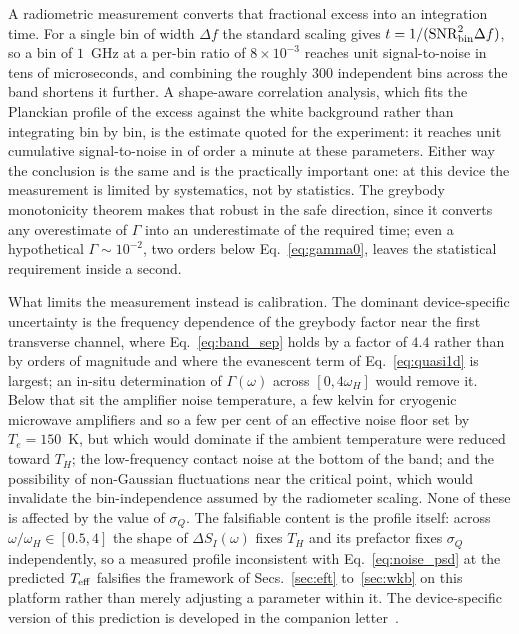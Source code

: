 \documentclass[aps,prd,reprint,nofootinbib,superscriptaddress]{revtex4-2}
\begin{document}
A radiometric measurement converts that fractional excess into an
integration time. For a single bin of width $\Delta f$ the standard
scaling gives $t = 1/(\mathrm{SNR}_{\rm bin}^2 \Delta f)$, so a bin of
$1$~GHz at a per-bin ratio of $8\times10^{-3}$ reaches unit
signal-to-noise in tens of microseconds, and combining the roughly $300$
independent bins across the band shortens it further. A shape-aware
correlation analysis, which fits the Planckian profile of the excess
against the white background rather than integrating bin by bin, is the
estimate quoted for the experiment: it reaches unit cumulative
signal-to-noise in of order a minute at these parameters.
Either way the conclusion is the same and is the practically important
one: at this device the measurement is limited by systematics, not by
statistics. The greybody monotonicity theorem makes that robust in the
safe direction, since it converts any overestimate of $\Gamma$ into an
underestimate of the required time; even a hypothetical
$\Gamma \sim 10^{-2}$, two orders below Eq.~\eqref{eq:gamma0}, leaves the
statistical requirement inside a second.

What limits the measurement instead is calibration. The dominant
device-specific uncertainty is the frequency dependence of the greybody
factor near the first transverse channel, where
Eq.~\eqref{eq:band_sep} holds by a factor of $4.4$ rather than by orders
of magnitude and where the evanescent term of Eq.~\eqref{eq:quasi1d} is
largest; an in-situ determination of $\Gamma(\omega)$ across
$[0,4\omega_H]$ would remove it. Below that sit the amplifier noise
temperature, a few kelvin for cryogenic microwave amplifiers and so a few
per cent of an effective noise floor set by $T_e = 150$~K, but which
would dominate if the ambient temperature were reduced toward $T_H$; the
low-frequency contact noise at the bottom of the band; and the
possibility of non-Gaussian fluctuations near the critical point, which
would invalidate the bin-independence assumed by the radiometer scaling.
None of these is affected by the value of $\sigma_Q$. The falsifiable
content is the profile itself: across
$\omega/\omega_H \in [0.5,4]$ the shape of $\Delta S_I(\omega)$ fixes
$T_H$ and its prefactor fixes $\sigma_Q$ independently, so a measured
profile inconsistent with Eq.~\eqref{eq:noise_psd} at the predicted
$T_{\rm eff}$ falsifies the framework of
Secs.~\ref{sec:eft} to~\ref{sec:wkb} on this platform rather than merely
adjusting a parameter within it. The device-specific version of this
prediction is developed in the companion letter~\cite{Roehm2026E2}.
\end{document}
